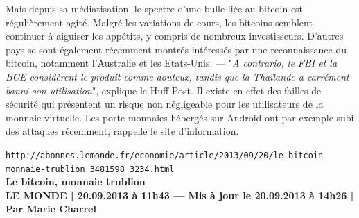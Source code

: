 \documentclass[11pt,twoside,a4paper]{article}
\begin{document}
Mais depuis sa m{\'e}diatisation, le spectre d'une bulle li{\'e}e au bitcoin est r{\'e}guli{\`e}rement agit{\'e}. Malgr{\'e} les variations de cours, les bitcoins semblent continuer {\`a} aiguiser les app{\'e}tits, y compris de nombreux investisseurs. D'autres pays se sont {\'e}galement r{\'e}cemment montr{\'e}s int{\'e}ress{\'e}s par une reconnaissance du bitcoin, notamment l'Australie et les Etats-Unis. --- "\emph{A contrario, le FBI et la BCE consid{\`e}rent le produit comme douteux, tandis que la Tha{\"i}lande a carr{\'e}ment banni son utilisation}", explique le Huff Post. Il existe en effet des failles de s{\'e}curit{\'e} qui pr{\'e}sentent un risque non n{\'e}gligeable pour les utilisateurs de la monnaie virtuelle. Les porte-monnaies h{\'e}berg{\'e}s sur Android ont par exemple subi des attaques r{\'e}cemment, rappelle le site d'information. ~\\

\clearpage

\texttt{http://abonnes.lemonde.fr/economie/article/2013/09/20/le-bitcoin-monnaie-trublion\_3481598\_3234.html}~\\

\textbf{Le bitcoin, monnaie trublion}~\\

\textbf{\small LE MONDE | 20.09.2013 {\`a} 11h43 --- Mis {\`a} jour le 20.09.2013 {\`a} 14h26 | Par Marie Charrel  }~\\
\end{document}
